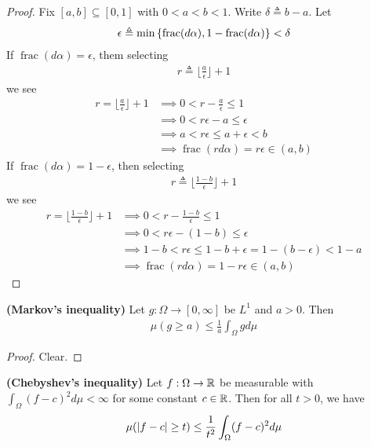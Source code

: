 \documentclass{report}
\begin{document}
\begin{proof}
Fix $[a,b]\subseteq [0,1]$ with $0<a<b<1$. Write $\delta\triangleq b-a$. Let 
\begin{align*}
\epsilon  \triangleq \min \left\{ \operatorname{frac}(d\alpha ),1- \operatorname{frac}(d\alpha ) \right\}< \delta  
\end{align*}
If $\operatorname{frac}(d\alpha )=\epsilon $, them selecting 
\begin{align*}
r \triangleq \lfloor \frac{a}{\epsilon } \rfloor + 1
\end{align*}
we see 
\begin{align*}
  r = \lfloor \frac{a}{\epsilon } \rfloor +1&\implies  0 < r- \frac{a}{\epsilon }\leq 1 \\
 &\implies  0 < r\epsilon  - a \leq  \epsilon  \\
 &\implies  a < r\epsilon \leq  a+\epsilon  < b \\
  &\implies  \operatorname{frac}(rd \alpha  )=r\epsilon  \in (a,b)
\end{align*}
If $\operatorname{frac}(d\alpha )= 1-\epsilon $, then selecting 
\begin{align*}
r \triangleq \lfloor \frac{1-b}{\epsilon } \rfloor +1 
\end{align*}
we see 
\begin{align*}
  r = \lfloor \frac{1-b}{\epsilon } \rfloor  +1   &\implies 0 < r - \frac{1-b}{\epsilon }\leq 1 \\
  &\implies 0< r\epsilon  - (1-b) \leq \epsilon  \\
  &\implies 1-b < r \epsilon  \leq  1- b + \epsilon = 1- (b-\epsilon ) < 1-a \\
  &\implies  \operatorname{frac}(rd\alpha )= 1-r\epsilon  \in (a,b)
\end{align*}
\end{proof}
\begin{theorem}
\textbf{(Markov's inequality)} Let $g:\Omega \rightarrow [0,\infty]$ be $L^1$ and  $a>0$. Then 
\begin{align*}
\mu (g \geq a)\leq \frac{1}{a}\int_\Omega g d\mu  
\end{align*}
\end{theorem}
\begin{proof}
Clear. 
\end{proof}
\begin{theorem}
\label{THCi}
\textbf{(Chebyshev's inequality)} Let $f:\Omega \rightarrow \mathbb{R}$ be measurable with $\int_{\Omega}(f-c)^2 d\mu < \infty$ for some constant $c \in\mathbb{R} $. Then for all $t>0$, we have 
 \begin{align*}
\mu (\left|f-c\right|\geq t)\leq \frac{1}{t^2} \int_{\Omega} (f-c)^2 d\mu  
\end{align*}
\end{theorem}
\end{document}
